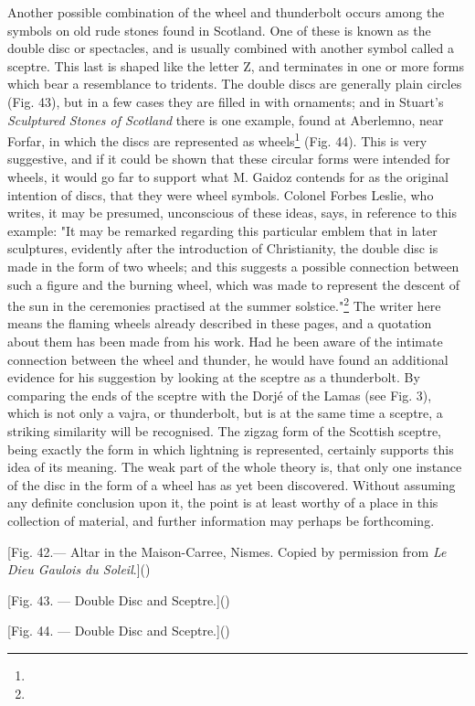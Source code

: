 \documentclass[a4paper, 11pt, oneside, polutonikogreek, english]{article}
\begin{document}
Another possible combination of the wheel and thunderbolt occurs among the symbols on old rude stones found in Scotland. One of these is known as the double disc or spectacles, and is usually combined with another symbol called a sceptre. This last is shaped like the letter Z, and terminates in one or more forms which bear a resemblance to tridents. The double discs are generally plain circles (Fig. 43), but in a few cases they are filled in with ornaments; and in Stuart's \emph{Sculptured Stones of Scotland} there is one example, found at Aberlemno, near Forfar, in which the discs are represented as wheels\footnote{} (Fig. 44). This is very suggestive, and if it could be shown that these circular forms were intended for wheels, it would go far to support what M. Gaidoz contends for as the original intention of discs, that they were wheel symbols. Colonel Forbes Leslie, who writes, it may be presumed, unconscious of these ideas, says, in reference to this example: "It may be remarked regarding this particular emblem that in later sculptures, evidently after the introduction of Christianity, the double disc is made in the form of two wheels; and this suggests a possible connection between such a figure and the burning wheel, which was made to represent the descent of the sun in the ceremonies practised at the summer solstice."\footnote{} The writer here means the flaming wheels already described in these pages, and a quotation about them has been made from his work. Had he been aware of the intimate connection between the wheel and thunder, he would have found an additional evidence for his suggestion by looking at the sceptre as a thunderbolt. By comparing the ends of the sceptre with the Dorjé of the Lamas (see Fig. 3), which is not only a vajra, or thunderbolt, but is at the same time a sceptre, a striking similarity will be recognised. The zigzag form of the Scottish sceptre, being exactly the form in which lightning is represented, certainly supports this idea of its meaning. The weak part of the whole theory is, that only one instance of the disc in the form of a wheel has as yet been discovered. Without assuming any definite conclusion upon it, the point is at least worthy of a place in this collection of material, and further information may perhaps be forthcoming.
 
[Fig. 42.--- Altar in the Maison-Carree, Nismes. Copied by permission from \emph{Le Dieu Gaulois du Soleil}.]()

[Fig. 43. --- Double Disc and Sceptre.]()

[Fig. 44. --- Double Disc and Sceptre.]()
\end{document}

